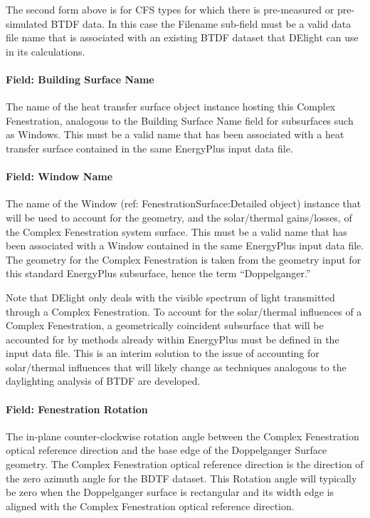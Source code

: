The second form above is for CFS types for which there is pre-measured or pre-simulated BTDF data. In this case the Filename sub-field must be a valid data file name that is associated with an existing BTDF dataset that DElight can use in its calculations.

\paragraph{Field: Building Surface Name}\label{field-building-surface-name}

The name of the heat transfer surface object instance hosting this Complex Fenestration, analogous to the Building Surface Name field for subsurfaces such as Windows. This must be a valid name that has been associated with a heat transfer surface contained in the same EnergyPlus input data file.

\paragraph{Field: Window Name}\label{field-window-name}

The name of the Window (ref: FenestrationSurface:Detailed object) instance that will be used to account for the geometry, and the solar/thermal gains/losses, of the Complex Fenestration system surface. This must be a valid name that has been associated with a Window contained in the same EnergyPlus input data file. The geometry for the Complex Fenestration is taken from the geometry input for this standard EnergyPlus subsurface, hence the term ``Doppelganger.''

Note that DElight only deals with the visible spectrum of light transmitted through a Complex Fenestration. To account for the solar/thermal influences of a Complex Fenestration, a geometrically coincident subsurface that will be accounted for by methods already within EnergyPlus must be defined in the input data file. This is an interim solution to the issue of accounting for solar/thermal influences that will likely change as techniques analogous to the daylighting analysis of BTDF are developed.

\paragraph{Field: Fenestration Rotation}\label{field-fenestration-rotation}

The in-plane counter-clockwise rotation angle between the Complex Fenestration optical reference direction and the base edge of the Doppelganger Surface geometry. The Complex Fenestration optical reference direction is the direction of the zero azimuth angle for the BDTF dataset. This Rotation angle will typically be zero when the Doppelganger surface is rectangular and its width edge is aligned with the Complex Fenestration optical reference direction.


